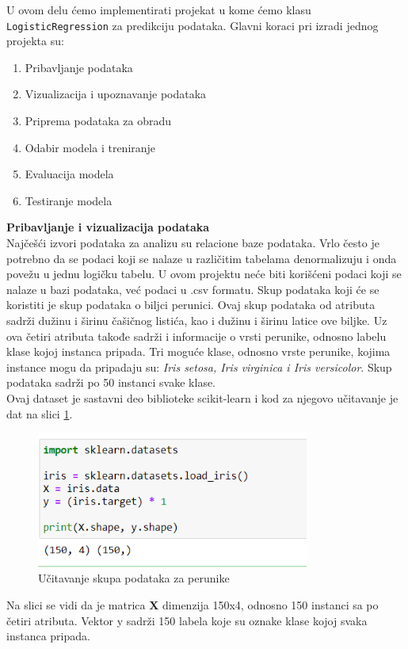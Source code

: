 \documentclass[a4paper,12pt]{report}
\begin{document}
U ovom delu ćemo implementirati projekat u kome ćemo klasu \texttt{LogisticRegression} za predikciju podataka. Glavni koraci pri izradi jednog projekta su: 
\begin{enumerate}
\item Pribavljanje podataka
\item Vizualizacija i upoznavanje podataka
\item Priprema podataka za obradu
\item Odabir modela i treniranje
\item Evaluacija modela
\item Testiranje modela
\end{enumerate}

\textbf{Pribavljanje i vizualizacija podataka}\\
 
Najčešći izvori podataka za analizu su relacione baze podataka. Vrlo često je potrebno da se podaci koji se nalaze u različitim tabelama denormalizuju i onda povežu u jednu logičku tabelu. U ovom projektu neće biti korišćeni podaci koji se nalaze u bazi podataka, već podaci u .csv formatu. Skup podataka koji će se koristiti je skup podataka o biljci perunici. Ovaj skup podataka od atributa sadrži dužinu i širinu čašičnog listića, kao i dužinu i širinu latice ove biljke. Uz ova četiri atributa takođe sadrži i informacije o vrsti perunike, odnosno labelu klase kojoj instanca pripada. Tri moguće klase, odnosno vrste perunike, kojima instance mogu da pripadaju su: \textit{Iris setosa, Iris virginica i Iris versicolor}. Skup podataka sadrži po 50 instanci svake klase. \\

Ovaj dataset je sastavni deo biblioteke scikit-learn i kod za njegovo učitavanje je dat na slici \ref{fig:irisload}.
\begin{figure}[h]
    \centering
    \includegraphics[width=0.8\textwidth]{iris_load.png}
    \caption{Učitavanje skupa podataka za perunike}\label{fig:irisload}
\end{figure}
 Na slici se vidi da je matrica \textbf{X} dimenzija 150x4, odnosno 150 instanci sa po četiri atributa. Vektor y sadrži 150 labela koje su oznake klase kojoj svaka instanca pripada.\\ 
 
\end{document}
